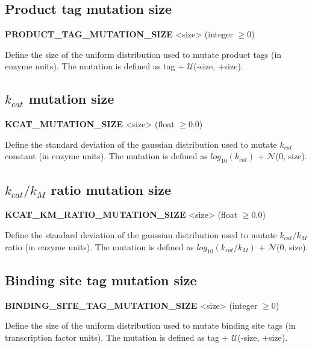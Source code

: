 
\subsection{Product tag mutation size}
\begin{center}
{\bf PRODUCT\_TAG\_MUTATION\_SIZE} <size> (integer $\ge 0$)
\end{center}
Define the size of the uniform distribution used to mutate product tags (in enzyme units). The mutation is defined as tag + $\mathcal{U}$(-size, +size).


\subsection{$k_{cat}$ mutation size}
\begin{center}
{\bf KCAT\_MUTATION\_SIZE} <size> (float $\ge 0.0$)
\end{center}
Define the standard deviation of the gaussian distribution used to mutate $k_{cat}$ constant (in enzyme units). The mutation is defined as $log_{10}(k_{cat})$ + $\mathcal{N}$(0, size).


\subsection{$k_{cat}/k_M$ ratio mutation size}
\begin{center}
{\bf KCAT\_KM\_RATIO\_MUTATION\_SIZE} <size> (float $\ge 0.0$)
\end{center}
Define the standard deviation of the gaussian distribution used to mutate $k_{cat}/k_M$ ratio (in enzyme units). The mutation is defined as $log_{10}(k_{cat}/k_M)$ + $\mathcal{N}$(0, size).


\subsection{Binding site tag mutation size}
\begin{center}
{\bf BINDING\_SITE\_TAG\_MUTATION\_SIZE} <size> (integer $\ge 0$)
\end{center}
Define the size of the uniform distribution used to mutate binding site tags (in transcription factor units). The mutation is defined as tag + $\mathcal{U}$(-size, +size).

